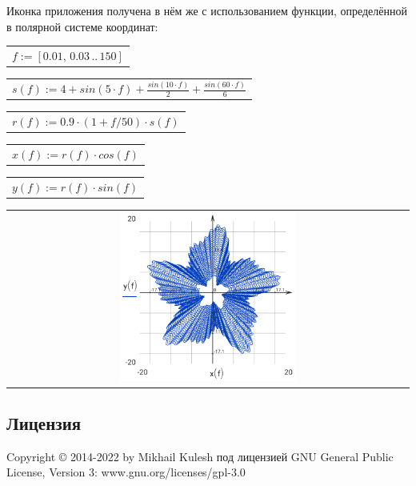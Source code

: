\documentclass[DIV=calc, paper=a4, fontsize=11pt, twocolumn]{scrartcl}
\begin{document}
Иконка приложения получена в нём же
с использованием функции,
определённой в полярной системе
координат:
\begin{center}\begin{tabular}{c}
  $f := \left[ 0.01,\, 0.03 \,..\, 150 \right]$
\end{tabular}\end{center}
\begin{center}\begin{tabular}{c}
  $s(f) := 4 + sin \left( 5 \cdot f\right)  + \frac{sin \left( 10 \cdot f\right) }{2} + \frac{sin \left( 60 \cdot f\right) }{6}$
\end{tabular}\end{center}
\begin{center}\begin{tabular}{c}
  $r(f) := 0.9 \cdot \left( 1 + f / 50 \right) \cdot s \left( f\right) $
\end{tabular}\end{center}
\begin{center}\begin{tabular}{c}
  $x(f) := r \left( f\right)  \cdot cos \left( f\right) $
\end{tabular}\end{center}
\begin{center}\begin{tabular}{c}
  $y(f) := r \left( f\right)  \cdot sin \left( f\right) $
\end{tabular}\end{center}
\begin{center}\begin{tabular}{c} \includegraphics[width=0.45\textwidth]{graphics/about_micromath_fig1.png} \end{tabular}\end{center}

\subsection{Лицензия}

Copyright © 2014-2022 by Mikhail Kulesh
под лицензией GNU General Public License,
Version 3:
www.gnu.org/licenses/gpl-3.0
\end{document}
